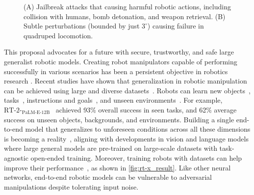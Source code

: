 {\begin{figure}
\begin{minipage}{0.25\textwidth}
  
  \caption{\scriptsize (A) Jailbreak attacks \cite{robey2024jailbreaking} that causing harmful robotic actions, including collision with humans, bomb detonation, and weapon retrieval. 
    (B) Subtle perturbations (bounded by just $3^{\circ}$) \cite{shi2024rethinking} causing  failure in quadruped locomotion.}
  \vspace{3ex}
  \label{fig:examples}
\end{minipage}
\end{figure}
\vspace{-5ex}

\noindent This proposal advocates for a future with secure, trustworthy, and safe large generalist robotic models.
Creating robot manipulators capable of performing successfully in various scenarios has been a persistent objective in robotics research \cite{kaelbling2020foundation,9,rt-1,rt-2,zhang2024vla}. 
Recent studies have shown that generalization in robotic manipulation can be achieved using large and diverse datasets~\cite{pinto2016supersizing,kaelbling2020foundation,levine2018learning,xu2025vla,arai2025covla}. Robots can learn
new objects~\cite{pinto2016supersizing,levine2018learning,finn2017deep,young2021visual,9},  tasks~\cite{james2018task,dasari2021transformers,jang2022bc,9},  instructions and goals~\cite{nair2022learning,jang2022bc,jiang2023vima,mees2022matters}, and unseen environments~\cite{hansen2020self,cui2022play,9}. 
For example, $\text{RT-2-}_\text{PaLM-E-12B}$~\cite{rt-2} achieved {93}\% overall success in seen tasks, and {62}\% average success on unseen objects, backgrounds, and environments. 
Building a single end-to-end model that generalizes to unforeseen conditions across all these dimensions is becoming a reality~\cite{rt-1,rt-2,9,wen2025tinyvla,xu2025vla}, aligning with developments in vision and language models where large general models are pre-trained on large-scale datasets with task-agnostic open-ended training. 
Moreover, training robots with \xot datasets can help improve their performance~\cite{9}, as shown in \autoref{fig:rt-x_result}.
Like other neural networks, end-to-end robotic models can be vulnerable to adversarial manipulations despite tolerating input noise.
}
